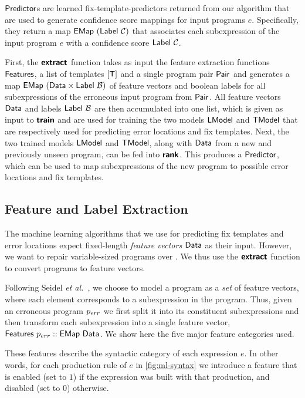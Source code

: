 $\mathsf{Predictor}$s are learned fix-template-predictors returned from our algorithm
that are used to generate confidence score mappings for input programs $e$.
Specifically, they return a map $\mathsf{EMap}\ (\mathsf{Label}\ \mathcal{C})$ that associates each
subexpression of the input program $e$ with a confidence score
$\mathsf{Label}\ \mathcal{C}$.

First, the $\bm{\mathsf{extract}}$ function takes as input the feature extraction
functions $\mathsf{Features}$, a list of templates $[\mathsf{T}]$ and a single program
pair $\mathsf{Pair}$ and generates a map $\mathsf{EMap}\ (\mathsf{Data} \times
\mathsf{Label}\ \mathcal{B})$ of feature vectors and boolean labels for all
subexpressions of the erroneous input program from $\mathsf{Pair}$.
%
All feature vectors $\mathsf{Data}$ and labels $\mathsf{Label}\ \mathcal{B}$ are then
accumulated into one list, which is given as input to $\bm{\mathsf{train}}$ and are used
for training the two models $\mathsf{LModel}$ and $\mathsf{TModel}$ that are respectively used
for predicting error locations and fix templates.
%
Next, the two trained models $\mathsf{LModel}$ and $\mathsf{TModel}$, along with $\mathsf{Data}$ from
a new and previously unseen program, can be fed into $\bm{\mathsf{rank}}$. This
produces a $\mathsf{Predictor}$, which can be used to map subexpressions of the new
program to possible error locations and fix templates.




\subsection{Feature and Label Extraction}
\label{sec:templ-pred:extract}
The machine learning algorithms that we use for predicting fix templates and
error locations expect fixed-length \emph{feature vectors} $\mathsf{Data}$ as their
input. However, we want to repair variable-sized programs over \lang. We thus
use the $\bm{\mathsf{extract}}$ function to convert programs to feature vectors.

Following Seidel \emph{et al.}~\citep{Seidel:2017}, we choose to model a program as a \emph{set} of
feature vectors, where each element corresponds to a subexpression in the
program. Thus, given an erroneous program $p_{err}$ we first split it into its
constituent subexpressions and then transform each subexpression into a single
feature vector, \ie $\mathsf{Features}\ p_{err} :: \mathsf{EMap}\ \mathsf{Data}$. We show here
the five major feature categories used.

These features describe the syntactic category of each expression $e$. In other
words, for each production rule of $e$ in \autoref{fig:ml-syntax} we introduce a
feature that is enabled (set to $1$) if the expression was built with that
production, and disabled (set to $0$) otherwise.

